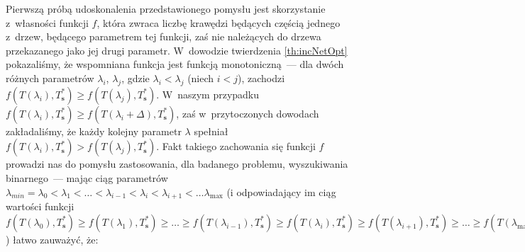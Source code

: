 Pierwszą próbą udoskonalenia przedstawionego pomysłu jest skorzystanie z~własności funkcji $f$, która zwraca liczbę krawędzi będących częścią jednego z~drzew, będącego parametrem tej funkcji, zaś nie należących do drzewa przekazanego jako jej drugi parametr.
W~dowodzie twierdzenia \ref{th:incNetOpt} pokazaliśmy, że wspomniana funkcja jest funkcją monotoniczną~--- dla dwóch różnych parametrów $\lambda_{i}$, $\lambda_{j}$, gdzie $\lambda_{i} < \lambda_{j}$ (niech $i < j$), zachodzi $f \left( T \left( \lambda_{i} \right), T^{\ast}_{\textbf{s}} \right) \geqslant f \left( T \left( \lambda_{j} \right), T^{\ast}_{\textbf{s}} \right)$.
W~naszym przypadku $f \left( T \left( \lambda_{i} \right), T^{\ast}_{\textbf{s}} \right) \geqslant f \left( T \left( \lambda_{i} + \Delta \right), T^{\ast}_{\textbf{s}} \right)$, zaś w~przytoczonych dowodach zakładaliśmy, że każdy kolejny parametr $\lambda$ spełniał $f \left( T \left( \lambda_{i} \right), T^{\ast}_{\textbf{s}} \right) > f \left( T \left( \lambda_{j} \right), T^{\ast}_{\textbf{s}} \right)$.
Fakt takiego zachowania się funkcji $f$ prowadzi nas do pomysłu zastosowania, dla badanego problemu, wyszukiwania binarnego~--- mając ciąg parametrów $\lambda_{min} = \lambda_{0} < \lambda_{1} < \dots < \lambda_{i-1} < \lambda_{i} < \lambda_{i+1} < \dots \lambda_{\text{max}}$ (i odpowiadający im ciąg wartości funkcji $f \left( T \left( \lambda_{0} \right), T^{\ast}_{\textbf{s}} \right) \geqslant f \left( T \left( \lambda_{1} \right), T^{\ast}_{\textbf{s}} \right) \geqslant \dots \geqslant f \left( T \left( \lambda_{i-1} \right), T^{\ast}_{\textbf{s}} \right) \geqslant f \left( T \left( \lambda_{i} \right), T^{\ast}_{\textbf{s}} \right) \geqslant f \left( T \left( \lambda_{i+1} \right), T^{\ast}_{\textbf{s}} \right) \geqslant \dots \geqslant f \left( T \left( \lambda_{\text{max}} \right), T^{\ast}_{\textbf{s}} \right)$) łatwo zauważyć, że:

